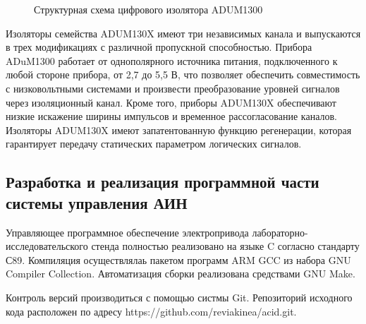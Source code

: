         \begin{figure}[h!]
            \caption{Структурная схема цифрового изолятора ADUM1300}
            \label{fig:adum1300}
        \end{figure}

        Изоляторы семейства ADUM130X имеют три независимых канала и выпускаются
        в трех модификациях с различной пропускной способностью. Прибора
        ADuM1300 работает от однополярного источника питания, подключенного к
        любой стороне прибора, от 2,7 до 5,5 В, что позволяет обеспечить
        совместимость с низковольтными системами и произвести преобразование
        уровней сигналов через изоляционный канал. Кроме того, приборы ADUM130X
        обеспечивают низкие искажение ширины импульсов и временное
        рассогласование каналов.  Изоляторы ADUM130X имеют запатентованную
        функцию регенерации, которая гарантирует передачу статических
        параметром логических сигналов.

    \subsection{Разработка и реализация программной части системы управления АИН}
        Управляющее программное обеспечение электропривода
        лабораторно- исследовательского стенда полностью реализовано на языке C
        согласно стандарту С89. Компиляция осуществлялаь пакетом программ ARM
        GCC из набора GNU Compiler Collection. Автоматизация сборки реализована
        средствами GNU Make.

        Контроль версий производиться с помощью систмы Git. Репозиторий
        исходного кода расположен по адресу
        https://github.com/reviakinea/acid.git.

